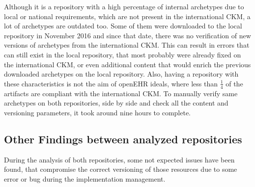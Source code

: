 \documentclass[mim_thesis.tex]{subfiles}
\begin{document}
Although it is a repository with a high percentage of internal archetypes due to local or national requirements, which are not present in the international CKM, a lot of archetypes are outdated too. Some of them were downloaded to the local repository in November 2016 and since that date, there was no verification of new versions of archetypes from the international CKM. This can result in errors that can still exist in the local repository, that most probably were already fixed on the international CKM, or even additional content that would enrich the previous downloaded archetypes on the local repository. Also, having a repository with these characteristics is not the aim of openEHR ideals, where less than \( \frac{1}{4} \) of the artifacts are compliant with the international CKM. To manually verify same archetypes on both repositories, side by side and check all the content and versioning parameters, it took around nine hours to complete. \\

\subsection{Other Findings between analyzed repositories}
During the analysis of both repositories, some not expected issues have been found, that compromise the correct versioning of those resources due to some error or bug during the implementation management.
\end{document}
